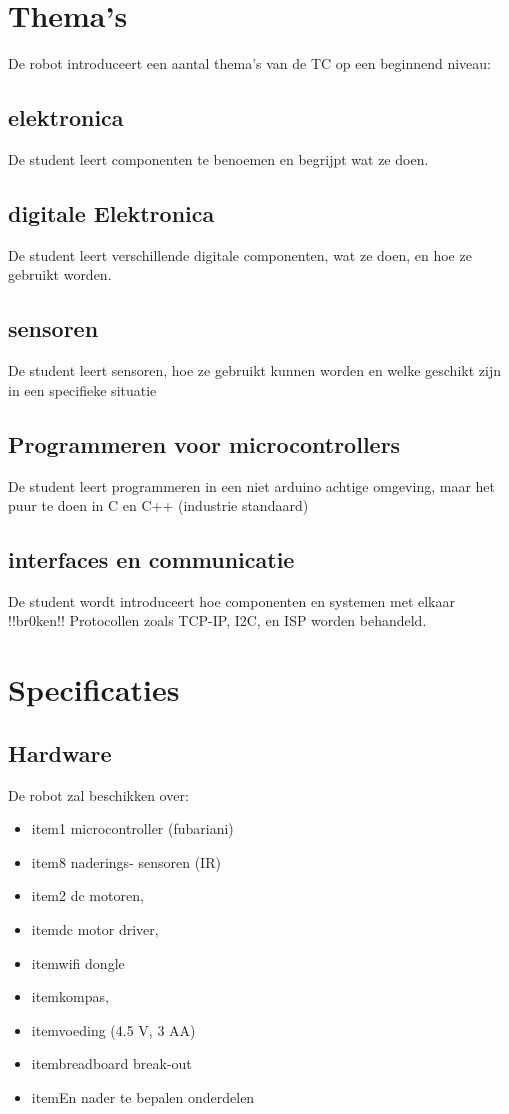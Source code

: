 \documentclass{article}
\begin{document}
\section{Thema's}
De robot introduceert een aantal thema's van de TC op een beginnend niveau:
\subsection{elektronica}
De student leert componenten te benoemen en begrijpt wat ze doen.
\subsection{digitale Elektronica}
De student leert verschillende digitale componenten, wat ze doen, en hoe ze gebruikt worden.
\subsection{sensoren}
De student leert sensoren, hoe ze gebruikt kunnen worden en welke geschikt zijn in een specifieke situatie
\subsection{Programmeren voor microcontrollers}
De student leert programmeren in een niet arduino achtige omgeving, maar het puur te doen in C en C++ (industrie standaard)
\subsection{interfaces en communicatie}
De student wordt introduceert hoe componenten en systemen met elkaar !!br0ken!! Protocollen zoals TCP-IP, I2C, en ISP worden behandeld. 
\section{Specificaties}
\subsection{Hardware}
De robot zal beschikken over:
\begin{itemize}
\item item1 microcontroller (fubariani)
\item item8 naderings- sensoren (IR)
\item item2 dc motoren,
\item itemdc motor driver,
\item itemwifi dongle
\item itemkompas,
\item itemvoeding (4.5 V, 3 AA)
\item itembreadboard break-out
\item itemEn nader te bepalen onderdelen
\end{itemize}
\end{document}
